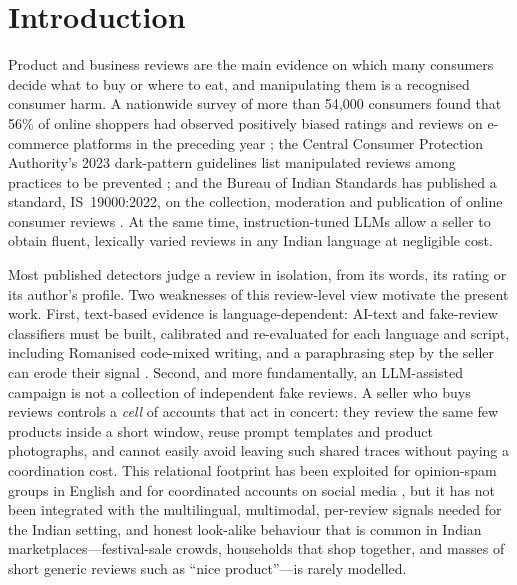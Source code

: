 \documentclass[pdflatex,sn-basic]{sn-jnl}
\theoremstyle{thmstyleone}
\theoremstyle{thmstylethree}
\begin{document}

\maketitle

\section{Introduction}\label{sec:intro}

Product and business reviews are the main evidence on which many consumers decide what to buy or where to eat, and manipulating them is a recognised consumer harm. A nationwide survey of more than 54{,}000 consumers found that 56\% of online shoppers had observed positively biased ratings and reviews on e-commerce platforms in the preceding year \citep{localcircles2024}; the Central Consumer Protection Authority's 2023 dark-pattern guidelines list manipulated reviews among practices to be prevented \citep{ccpa2023}; and the Bureau of Indian Standards has published a standard, IS~19000:2022, on the collection, moderation and publication of online consumer reviews \citep{bis19000}. At the same time, instruction-tuned LLMs \citep{openai2023gpt4,geminiteam2023} allow a seller to obtain fluent, lexically varied reviews in any Indian language at negligible cost.

Most published detectors judge a review in isolation, from its words, its rating or its author's profile. Two weaknesses of this review-level view motivate the present work. First, text-based evidence is language-dependent: AI-text and fake-review classifiers must be built, calibrated and re-evaluated for each language and script, including Romanised code-mixed writing, and a paraphrasing step by the seller can erode their signal \citep{mitchell2023,salminen2022}. Second, and more fundamentally, an LLM-assisted campaign is not a collection of independent fake reviews. A seller who buys reviews controls a \emph{cell} of accounts that act in concert: they review the same few products inside a short window, reuse prompt templates and product photographs, and cannot easily avoid leaving such shared traces without paying a coordination cost. This relational footprint has been exploited for opinion-spam groups in English \citep{mukherjee2012,wang2011,akoglu2013,hooi2016,kumar2018} and for coordinated accounts on social media \citep{pacheco2021}, but it has not been integrated with the multilingual, multimodal, per-review signals needed for the Indian setting, and honest look-alike behaviour that is common in Indian marketplaces---festival-sale crowds, households that shop together, and masses of short generic reviews such as ``nice product''---is rarely modelled.
\end{document}
